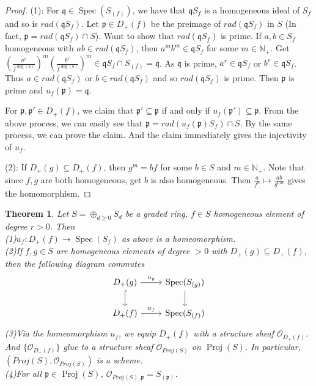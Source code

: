 \documentclass{ctexart}
\newtheorem{theorem}{Theorem}[section]
\newcommand{\spec}{\operatorname{Spec}}
\newcommand{\proj}{\operatorname{Proj}}
\begin{document}
\begin{proof}
    (1): For $\mathfrak{q}\in \spec(S_{(f)})$, we have that $\mathfrak{q}S_{f}$ is a homogeneous ideal of $S_{f}$ and so is $rad(\mathfrak{q}S_{f})$.
    Let $\mathfrak{p}\in D_{+}(f)$ be the preimage of $rad(\mathfrak{q}S_{f})$ in $S$ (In fact, $\mathfrak{p} = rad(\mathfrak{q}S_{f}) \cap S$).
    Want to show that $rad(\mathfrak{q}S_{f})$ is prime.
    If $a,b\in S_{f}$ homogeneous with $ab\in rad(\mathfrak{q}S_{f})$, then $a^{m}b^{m}\in \mathfrak{q}S_{f}$ for some $m\in \mathbb{N}_{+}$.
    Get $(\frac{a^{r}}{f^{\deg(a)}})^{m}(\frac{b^{r}}{f^{\deg(b)}})^{m}\in \mathfrak{q}S_{f} \cap S_{(f)} = \mathfrak{q}$.
    As $\mathfrak{q}$ is prime, $a^{r}\in \mathfrak{q}S_{f}$ or $b^{r}\in \mathfrak{q}S_{f}$.
    Thus $a\in rad(\mathfrak{q}S_{f})$ or $b\in rad(\mathfrak{q}S_{f})$ and so $rad(\mathfrak{q}S_{f})$ is prime.
    Then $\mathfrak{p}$ is prime and $u_{f}(\mathfrak{p}) = \mathfrak{q}$.
    \par
    For $\mathfrak{p},\mathfrak{p}'\in D_{+}(f)$, we claim that $\mathfrak{p}' \subseteq \mathfrak{p}$ if and only if $u_{f}(\mathfrak{p}') \subseteq \mathfrak{p}$.
    From the above process, we can easily see that $\mathfrak{p} = rad(u_{f}(\mathfrak{p})S_{f}) \cap S$.
    By the same process, we can prove the claim.
    And the claim immediately gives the injectivity of $u_{f}$.
    \par
    (2): If $D_{+}(g) \subseteq D_{+}(f)$, then $g^{m} = bf$ for some $b\in S$ and $m\in \mathbb{N}_{+}$.
    Note that since $f,g$ are both homogeneous, get $b$ is also homogeneous.
    Then $\frac{a}{f^{n}} \longmapsto \frac{ab}{g^{mn}}$ gives the homomorphism.
\end{proof}
\begin{theorem}
    Let $S = \oplus_{d \ge 0} S_{d}$ be a graded ring, $f\in S$ homogeneous element of degree $r > 0$.
    Then \\
    (1)$u_{f}: D_{+}(f) \longrightarrow \spec(S_{f})$ as above is a homeomorphism. \\
    (2)If $f,g\in S$ are homogeneous elements of degree $> 0$ with $D_{+}(g) \subseteq D_{+}(f)$,
    then the following diagram commutes 
    \begin{equation*}
        \begin{tikzcd}
            D_{+}(g) \arrow[r, "u_{g}"] \arrow[d, hookrightarrow] &
            \spec(S_{(g)}) \arrow[d] \\
            D_{+}(f) \arrow[r, "u_{f}"] &
            \spec(S_{(f)})
        \end{tikzcd}
    \end{equation*}
    (3)Via the homeomorphism $u_{f}$, we equip $D_{+}(f)$ with a structure sheaf $\mathcal{O}_{D_{+}(f)}$.
    And $\{\mathcal{O}_{D_{+}(f)}\}$ glue to a structure sheaf $\mathcal{O}_{Proj(S)}$ on $\proj(S)$.
    In particular, $(Proj(S), \mathcal{O}_{Proj(S)})$ is a scheme. \\
    (4)For all $\mathfrak{p}\in \proj(S)$, $\mathcal{O}_{Proj(S), \mathfrak{p}} = S_{(\mathfrak{p})}$.
    \label{Theorem 1.3}
\end{theorem}
\end{document}
